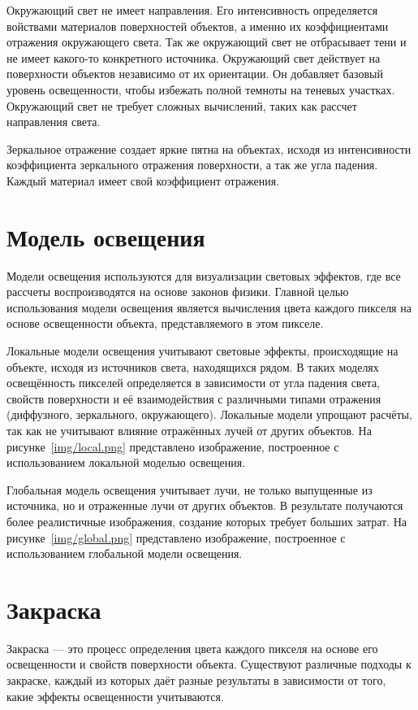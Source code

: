 Окружающий свет не имеет направления. Его интенсивность определяется войствами материалов поверхностей объектов, а именно их коэффициентами отражения окружающего света.
Так же окружающий свет не отбрасывает тени и не имеет какого-то конкретного источника.
Окружающий свет действует на поверхности объектов независимо от их ориентации. Он добавляет базовый уровень освещенности, чтобы избежать полной темноты на теневых участках. Окружающий свет не требует сложных вычислений, таких как рассчет направления света.
 
Зеркальное отражение создает яркие пятна на объектах, исходя из интенсивности коэффициента зеркального отражения поверхности, а так же угла падения.
Каждый материал имеет свой коэффициент отражения.

\section{Модель освещения}
Модели освещения используются для визуализации световых эффектов, где все рассчеты воспроизводятся на основе законов физики. Главной целью использования модели освещения является вычисления цвета каждого пикселя на основе освещенности объекта, представляемого в этом пикселе.

Локальные модели освещения учитывают световые эффекты, происходящие на объекте, исходя из источников света, находящихся рядом. В таких моделях освещённость пикселей определяется в зависимости от угла падения света, свойств поверхности и её взаимодействия с различными типами отражения (диффузного, зеркального, окружающего). Локальные модели упрощают расчёты, так как не учитывают влияние отражённых лучей от других объектов. На рисунке~\ref{img/local.png} представлено изображение, построенное с использованием локальной моделью освещения.


Глобальная модель освещения учитывает лучи, не только выпущенные из источника, но и отраженные лучи от других объектов. В результате получаются более реалистичные изображения, создание которых требует больших затрат. На рисунке~\ref{img/global.png} представлено изображение, построенное с использованием глобальной модели освещения.


\section{Закраска} Закраска — это процесс определения цвета каждого пикселя на основе его освещенности и свойств поверхности объекта. Существуют различные подходы к закраске, каждый из которых даёт разные результаты в зависимости от того, какие эффекты освещенности учитываются.

